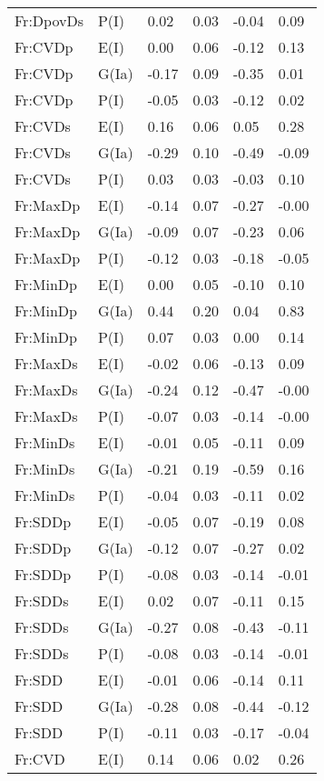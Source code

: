 \begin{center}
\begin{longtable}{|p{1.1in}|p{0.7in}|p{0.7in}|p{0.6in}|p{0.6in}|p{0.6in}|}
  Fr:DpovDs & P(I) & 0.02 & 0.03 & -0.04 & 0.09 \\ 
  Fr:CVDp & E(I) & 0.00 & 0.06 & -0.12 & 0.13 \\ 
  Fr:CVDp & G(Ia) & -0.17 & 0.09 & -0.35 & 0.01 \\ 
  Fr:CVDp & P(I) & -0.05 & 0.03 & -0.12 & 0.02 \\ 
  Fr:CVDs & E(I) & 0.16 & 0.06 & 0.05 & 0.28 \\ 
  Fr:CVDs & G(Ia) & -0.29 & 0.10 & -0.49 & -0.09 \\ 
  Fr:CVDs & P(I) & 0.03 & 0.03 & -0.03 & 0.10 \\ 
  Fr:MaxDp & E(I) & -0.14 & 0.07 & -0.27 & -0.00 \\ 
  Fr:MaxDp & G(Ia) & -0.09 & 0.07 & -0.23 & 0.06 \\ 
  Fr:MaxDp & P(I) & -0.12 & 0.03 & -0.18 & -0.05 \\ 
  Fr:MinDp & E(I) & 0.00 & 0.05 & -0.10 & 0.10 \\ 
  Fr:MinDp & G(Ia) & 0.44 & 0.20 & 0.04 & 0.83 \\ 
  Fr:MinDp & P(I) & 0.07 & 0.03 & 0.00 & 0.14 \\ 
  Fr:MaxDs & E(I) & -0.02 & 0.06 & -0.13 & 0.09 \\ 
  Fr:MaxDs & G(Ia) & -0.24 & 0.12 & -0.47 & -0.00 \\ 
  Fr:MaxDs & P(I) & -0.07 & 0.03 & -0.14 & -0.00 \\ 
  Fr:MinDs & E(I) & -0.01 & 0.05 & -0.11 & 0.09 \\ 
  Fr:MinDs & G(Ia) & -0.21 & 0.19 & -0.59 & 0.16 \\ 
  Fr:MinDs & P(I) & -0.04 & 0.03 & -0.11 & 0.02 \\ 
  Fr:SDDp & E(I) & -0.05 & 0.07 & -0.19 & 0.08 \\ 
  Fr:SDDp & G(Ia) & -0.12 & 0.07 & -0.27 & 0.02 \\ 
  Fr:SDDp & P(I) & -0.08 & 0.03 & -0.14 & -0.01 \\ 
  Fr:SDDs & E(I) & 0.02 & 0.07 & -0.11 & 0.15 \\ 
  Fr:SDDs & G(Ia) & -0.27 & 0.08 & -0.43 & -0.11 \\ 
  Fr:SDDs & P(I) & -0.08 & 0.03 & -0.14 & -0.01 \\ 
  Fr:SDD & E(I) & -0.01 & 0.06 & -0.14 & 0.11 \\ 
  Fr:SDD & G(Ia) & -0.28 & 0.08 & -0.44 & -0.12 \\ 
  Fr:SDD & P(I) & -0.11 & 0.03 & -0.17 & -0.04 \\ 
  Fr:CVD & E(I) & 0.14 & 0.06 & 0.02 & 0.26 \\ 

\end{longtable}
\end{center}
